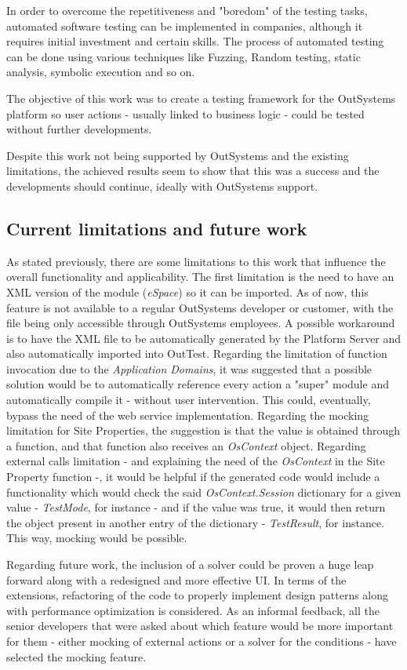 \documentclass{sigchi}
\begin{document}
In order to overcome the repetitiveness and "boredom" of the testing tasks, automated software testing can be implemented in companies, although it requires initial investment and certain skills. The process of automated testing can be done using various techniques like Fuzzing, Random testing, static analysis, symbolic execution and so on.

The objective of this work was to create a testing framework for the OutSystems platform so user actions - usually linked to business logic - could be tested without further developments. 

Despite this work not being supported by OutSystems and the existing limitations, the achieved results seem to show that this was a success and the developments should continue, ideally with OutSystems support.

\subsection{Current limitations and future work}
As stated previously, there are some limitations to this work that influence the overall functionality and applicability. The first limitation is the need to have an XML version of the module (\textit{eSpace}) so it can be imported. As of now, this feature is not available to a regular OutSystems developer or customer, with the file being only accessible through OutSystems employees. A possible workaround is to have the XML file to be automatically generated by the Platform Server and also automatically imported into OutTest. Regarding the limitation of function invocation due to the \textit{Application Domains}, it was suggested that a possible solution would be to automatically reference every action a "super" module and automatically compile it - without user intervention. This could, eventually, bypass the need of the web service implementation. Regarding the mocking limitation for Site Properties, the suggestion is that the value is obtained through a function, and that function also receives an \textit{OsContext} object. Regarding external calls limitation - and explaining the need of the \textit{OsContext} in the Site Property function -, it would be helpful if the generated code would include a functionality which would check the said \textit{OsContext.Session} dictionary for a given value - \textit{TestMode}, for instance - and if the value was true, it would then return the object present in another entry of the dictionary - \textit{TestResult}, for instance. This way, mocking would be possible.

Regarding future work, the inclusion of a solver could be proven a huge leap forward along with a redesigned and more effective UI. In terms of the extensions, refactoring of the code to properly implement design patterns along with performance optimization is considered. As an informal feedback, all the senior developers that were asked about which feature would be more important for them - either mocking of external actions or a solver for the conditions - have selected the mocking feature.
\balance{}



\end{document}
